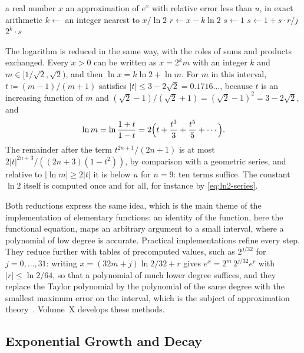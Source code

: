 \begin{algorithm}
\begin{algorithmic}[1]
\Require a real number $x$
\Ensure an approximation of $e^x$ with relative error less than $u$, in exact arithmetic
\State $k\gets$ an integer nearest to $x/\ln2$
\State $r\gets x-k\ln2$ 
\State $s\gets1$
  \State $s\gets1+s\cdot r/j$ 
\EndFor
\State \Return $2^k\cdot s$
\end{algorithmic}
\caption{The exponential function by argument reduction and a truncated series (\cref{prop:exp-reduction}). In floating-point arithmetic, line 2 needs $\ln2$ to more digits than the working precision when $|k|$ is large, for the reason explained in \cref{sec:identities-reduction}.}
\label{alg:exp}
\end{algorithm}

The logarithm is reduced in the same way, with the roles of sums and products exchanged. Every $x>0$ can be written as $x=2^km$ with an integer $k$ and $m\in[1/\sqrt2,\sqrt2)$, and then $\ln x=k\ln2+\ln m$. For $m$ in this interval, $t\coloneqq(m-1)/(m+1)$ satisfies $|t|\le3-2\sqrt2=0.1716\ldots$, because $t$ is an increasing function of $m$ and $(\sqrt2-1)/(\sqrt2+1)=(\sqrt2-1)^2=3-2\sqrt2$, and
\[
\ln m=\ln\frac{1+t}{1-t}=2\Bigl(t+\frac{t^3}3+\frac{t^5}5+\cdots\Bigr).
\]
The remainder after the term $t^{2n+1}/(2n+1)$ is at most $2|t|^{2n+3}/((2n+3)(1-t^2))$, by comparison with a geometric series, and relative to $|\ln m|\ge2|t|$ it is below $u$ for $n=9$: ten terms suffice. The constant $\ln2$ itself is computed once and for all, for instance by \eqref{eq:ln2-series}.

Both reductions express the same idea, which is the main theme of the implementation of elementary functions: an identity of the function, here the functional equation, maps an arbitrary argument to a small interval, where a polynomial of low degree is accurate. Practical implementations refine every step. They reduce further with tables of precomputed values, such as $2^{j/32}$ for $j=0,\ldots,31$: writing $x=(32m+j)\ln2/32+r$ gives $e^x=2^m\,2^{j/32}e^r$ with $|r|\le\ln2/64$, so that a polynomial of much lower degree suffices, and they replace the Taylor polynomial by the polynomial of the same degree with the smallest maximum error on the interval, which is the subject of approximation theory~\cite{muller2016elementary,cody1980}. Volume~X develops these methods.

\subsection{Exponential Growth and Decay}

